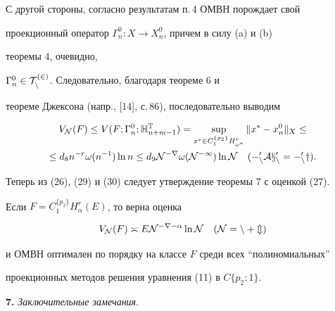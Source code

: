\begin{pf}
С другой стороны, согласно результатам п.\,4 ОМВН порождает свой 


проекционный оператор $\Gamma^0_n:X\to X^0_n$, причем в силу (a) и (b) 


теоремы 4, очевидно, 


$\Gamma^0_n\in\cal T^{(2)}_n$. Следовательно, благодаря теореме 6 и 


теореме Джексона (напр., [14], с.\,86), последовательно выводим 


\begin{multline} 


V_{\cal N}(F)\le V(F;\Gamma^0_n;\Bbb H^{\Bbb T}_{n+m-1})= 


\sup_{x^*\in C^{\{p_2\}}_1H^r_{\omega^*}}\|x^*-x^0_n\|_X\le \\ 


% 


\le d_8n^{-r}\omega(n^{-1})\ln n\le d_9\cal N^{-r} 


\omega(\cal N^{-1})\ln\cal N\quad (\Gamma^0_n A x^0_n= 


\Gamma^0_n y). 


\end{multline} 


Теперь из (26), (29) и (30) следует утверждение теоремы 7 с оценкой (27). 


\end{pf} 


 


\begin{cor} 


Если $F=C^{\{p_2\}}_1H^r_\alpha(E)$, то верна оценка 


$$ 


V_{\cal N}(F)\asymp E\cal N^{-r-\alpha}\ln\cal N\quad 


(\cal N=n+m) 


$$ 


и ОМВН оптимален по порядку на классе $F$ среди всех ``полиномиальных'' 


проекционных методов решения уравнения (11) в $C\{p_2;1\}$. 


\end{cor} 


 


{\bf 7.} {\it Заключительные замечания}. 


 


